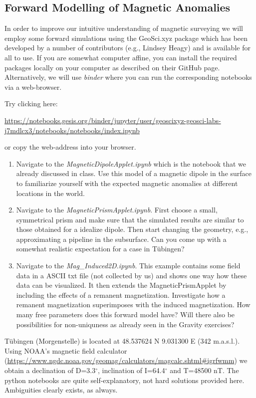 \subsection{Forward Modelling of Magnetic Anomalies}
\label{Sec:MagForwardModel}
In order to improve our intuitive understanding of magnetic surveying we will employ some forward simulations using the GeoSci.xyz package which has been developed by a number of contributors (e.g., Lindsey Heagy) and is available for all to use. If you are somewhat computer affine, you can install the required packages locally on your computer as described on their GitHub page. Alternatively, we will use \textit{binder} where you can run the corresponding notebooks via a web-browser. 
\vspace{0.25cm}

Try clicking here: 

\url{https://notebooks.gesis.org/binder/jupyter/user/geoscixyz-geosci-labs-j7mdlcx3/notebooks/notebooks/index.ipynb}

or copy the web-address into your browser.
\vspace{0.25cm}
\begin{enumerate}[label=(\alph*)]
    \item Navigate to the \textit{MagneticDipoleApplet.ipynb} which is the notebook that we already discussed in class. Use this model of a magnetic dipole in the surface to familiarize yourself with the expected magnetic anomalies at different locations in the world.
    \item Navigate to the \textit{MagneticPrismApplet.ipynb}. First choose a small, symmetrical prism and make sure that the simulated results are similar to those obtained for a idealize dipole. Then start changing the geometry, e.g., approximating a pipeline in the subsurface. Can you come up with a somewhat realistic expectation for a case in Tübingen?
    \item Navigate to the \textit{Mag\_Induced2D.ipynb}. This example contains some field data in a ASCII txt file (not collected by us) and shows one way how these data can be visualized. It then extends the MagneticPrismApplet by including the effects of a remanent magnetization. Investigate how a remanent magnetization superimposes with the induced magnetization. How many free parameters does this forward model have? Will there also be possibilities for non-uniquness as already seen in the Gravity exercises?
\end{enumerate}

\ifanswers
\begin{tcolorbox}[enhanced jigsaw,breakable,pad at break*=1mm,
    colback=blue!5!white,colframe=babyblueeyes,title=Solutions]
    
    Tübingen (Morgenstelle) is located at 48.537624 N 9.031300 E (342 m.a.s.l.). Using NOAA's magnetic field calculator (\url{https://www.ngdc.noaa.gov/geomag/calculators/magcalc.shtml#igrfwmm}) we obtain a declination of D=3.3$^{\circ}$, inclination of  I=64.4$^{\circ}$ and T=48500 nT. The python notebooks are quite self-explanatory, not hard solutions provided here. Ambiguities clearly exists, as always.


\end{tcolorbox}



\fi
